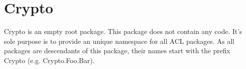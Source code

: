 \chapter{Crypto}

Crypto is an empty root package. This package does not contain any code.
It's sole purpose is to provide an unique namespace for all ACL packages.
As all packages are descendants of this package, their names start with
the prefix Crypto (e.g. Crypto.Foo.Bar).


 
